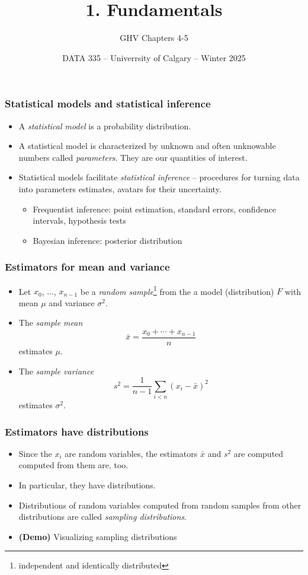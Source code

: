 \documentclass{beamer}
\title{1. Fundamentals}
\subtitle{GHV Chapters 4-5}
\institute{}
\date{DATA 335 -- Univerrsity of Calgary -- Winter 2025}
\begin{document}
\frame{\titlepage}

\begin{frame}
\frametitle{Statistical models and statistical inference}


\begin{itemize}
    \item A \emph{statistical model} is a probability distribution.
    \item A statistical model is characterized by unknown and often unknowable numbers called \emph{parameters}.
    They are our quantities of interest.
    \item Statistical models facilitate \emph{statistical inference} --
    procedures for turning data into parameters estimates,
    avatars for their uncertainty.
    \begin{itemize}
        \item Frequentist inference: point estimation, standard errors, confidence intervals, hypothesis tests
        \item Bayesian inference: posterior distribution
    \end{itemize}
\end{itemize}
\end{frame}

\begin{frame}
\frametitle{Estimators for mean and variance}
\begin{itemize}
\item Let $x_0$, $\ldots$, $x_{n - 1}$ be a
\emph{random sample}\footnote{independent and identically distributed}
from the a model (distribution) $F$ with mean $\mu$ and variance $\sigma^2$.

\item The \emph{sample mean}
$$
\bar{x} = \frac{x_0+\cdots+x_{n-1}}n
$$
estimates $\mu$.

\item The \emph{sample variance}
$$
s^2 = \frac1{n - 1}\sum_{i < n}(x_i - \bar{x})^2
$$
estimates $\sigma^2$.
\end{itemize}
\end{frame}

\begin{frame}
\frametitle{Estimators have distributions}

\begin{itemize}
    \item Since the $x_i$ are random variables, the estimators $\bar{x}$ and $s^2$ are computed computed from them are, too.
    \item In particular, they have distributions.
    \item Distributions of random variables computed from random samples from other distributions are called \emph{sampling distributions}.
    \item \textbf{(Demo)} Visualizing sampling distributions
\end{itemize}
\end{frame}
\end{document}
